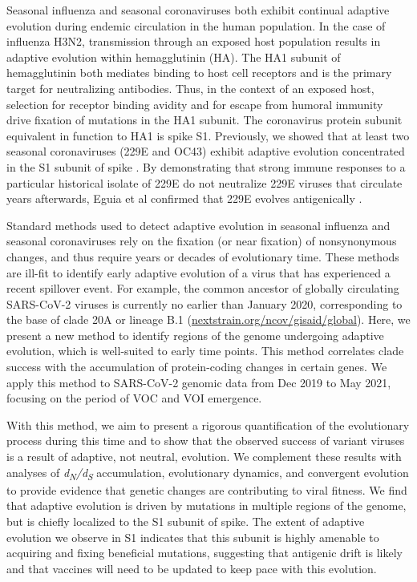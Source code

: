 \documentclass[11pt,oneside,letterpaper]{article}
\begin{document}
Seasonal influenza and seasonal coronaviruses both exhibit continual adaptive evolution during endemic circulation in the human population.
In the case of influenza H3N2, transmission through an exposed host population results in adaptive evolution within hemagglutinin (HA).
The HA1 subunit of hemagglutinin both mediates binding to host cell receptors and is the primary target for neutralizing antibodies.
Thus, in the context of an exposed host, selection for receptor binding avidity \cite{Hensley2009-at} and for escape from humoral immunity \cite{Bedford2014-rg} drive fixation of mutations in the HA1 subunit.
The coronavirus protein subunit equivalent in function to HA1 is spike S1.
Previously, we showed that at least two seasonal coronaviruses (229E and OC43) exhibit adaptive evolution concentrated in the S1 subunit of spike \cite{Kistler2021-va}.
By demonstrating that strong immune responses to a particular historical isolate of 229E do not neutralize 229E viruses that circulate years afterwards, Eguia et al confirmed that 229E evolves antigenically \cite{Eguia_2021}.

Standard methods used to detect adaptive evolution in seasonal influenza and seasonal coronaviruses rely on the fixation (or near fixation) of nonsynonymous changes, and thus require years or decades of evolutionary time.
These methods are ill-fit to identify early adaptive evolution of a virus that has experienced a recent spillover event.
For example, the common ancestor of globally circulating SARS-CoV-2 viruses is currently no earlier than January 2020, corresponding to the base of clade 20A or lineage B.1 (\href{https://nextstrain.org/ncov/gisaid/global}{nextstrain.org/ncov/gisaid/global}).
Here, we present a new method to identify regions of the genome undergoing adaptive evolution, which is well-suited to early time points.
This method correlates clade success with the accumulation of protein-coding changes in certain genes.
We apply this method to SARS-CoV-2 genomic data from Dec 2019 to May 2021, focusing on the period of VOC and VOI emergence.

With this method, we aim to present a rigorous quantification of the evolutionary process during this time and to show that the observed success of variant viruses is a result of adaptive, not neutral, evolution.
We complement these results with analyses of \emph{d\textsubscript{N}/d\textsubscript{S}} accumulation, evolutionary dynamics, and convergent evolution to provide evidence that genetic changes are contributing to viral fitness. 
We find that adaptive evolution is driven by mutations in multiple regions of the genome, but is chiefly localized to the S1 subunit of spike.
The extent of adaptive evolution we observe in S1 indicates that this subunit is highly amenable to acquiring and fixing beneficial mutations, suggesting that antigenic drift is likely and that vaccines will need to be updated to keep pace with this evolution.
\end{document}
